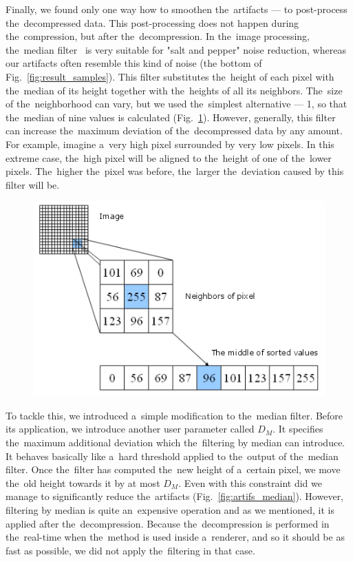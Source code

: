Finally, we found only one way how to smoothen the~artifacts --- to post-process the~decompressed data. This post-processing does not happen during the~compression, but after the~decompression. In the~image processing, the~median filter~\cite{image_proc} is very suitable for "salt and pepper" noise reduction, whereas our artifacts often resemble this kind of noise (the bottom of Fig.~\ref{fig:result_samples}). This filter substitutes the~height of each pixel with the~median of its height together with the~heights of all its neighbors. The~size of the~neighborhood can vary, but we used the~simplest alternative --- 1, so that the~median of nine values is calculated (Fig.~\ref{fig:median}). However, generally, this filter can increase the~maximum deviation of the~decompressed data by any amount. For example, imagine a~very high pixel surrounded by very low pixels. In this extreme case, the~high pixel will be aligned to the~height of one of the~lower pixels. The~higher the~pixel was before, the~larger the~deviation caused by this filter will be.

\begin{figure}
	\includegraphics[width = \textwidth]{figures/median.png}
	\label{fig:median}
\end{figure}

To tackle this, we introduced a~simple modification to the~median filter. Before its application, we introduce another user parameter called $D_M$. It specifies the~maximum additional deviation which the~filtering by median can introduce. It behaves basically like a~hard threshold applied to the~output of the~median filter. Once the~filter has computed the~new height of a~certain pixel, we move the~old height towards it by at most $D_M$. Even with this constraint did we manage to significantly reduce the~artifacts (Fig.~\ref{fig:artifs_median}). However, filtering by median is quite an~expensive operation and as we mentioned, it is applied after the~decompression. Because the~decompression is performed in the~real-time when the~method is used inside a~renderer, and so it should be as fast as possible, we did not apply the~filtering in that case.

